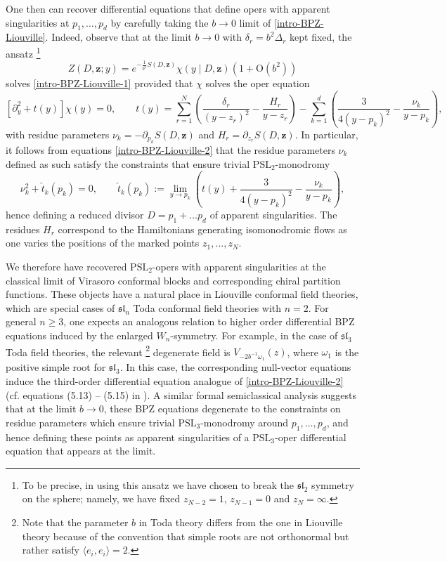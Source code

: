 \documentclass[twoside, 11pt]{article}
\numberwithin{equation}{section}
\theoremstyle{theorem}
\numberwithin{theorem}{section}
\theoremstyle{definition}
\begin{document}
One then can recover differential equations that define opers with apparent singularities at $p_1, \dots, p_d$ by carefully taking the $b \rightarrow 0$ limit of \eqref{intro-BPZ-Liouville}.
Indeed, observe that at the limit $b \rightarrow 0$ with $\delta_r = b^2 \Delta_r$ kept fixed, the ansatz 
\footnote{To be precise, in using this ansatz we have chosen to break the $\mathfrak{sl}_2$ symmetry on the sphere; namely, we have fixed $z_{N-2} = 1$, $z_{N-1} = 0$ and $z_N = \infty$.}
\[ Z(D, \mathbf{z}; y) =  e^{-\frac{1}{b^2}S(D, \mathbf{z})} \chi(y \mid D, \mathbf{z})  \left( 1 + \mathrm{O}(b^2) \right) \]
solves \eqref{intro-BPZ-Liouville-1} provided that $\chi$ solves the oper equation
\[ [\partial_y^2 + 
t(y)] \chi(y) = 0, \qquad t(y) = \sum_{r=1}^N \left( \frac{\delta_r}{(y-z_r)^2} - \frac{H_r}{y-z_r}\right) - 
\sum_{k=1}^d \left( \frac{3}{4(y-p_k)^2} - \frac{\nu_k}{y - p_k}\right), \]
with residue parameters $\nu_k = - \partial_{p_k} S(D, \mathbf{z})$ and $H_r = \partial_{z_r}S(D, \mathbf{z})$. In particular, it follows from equations \eqref{intro-BPZ-Liouville-2} that the residue parameters $\nu_k$ defined as such satisfy the constraints that ensure trivial $\mathrm{PSL}_2$-monodromy 
\[ \nu_k^2 + \check{t}_k(p_k) = 0, \qquad \check{t}_k(p_k) := \lim_{y \to p_k} \left( t(y) + \frac{3}{4(y - p_k)^2} - \frac{\nu_k}{y - p_k} \right), \] 
hence defining a reduced divisor $D = p_1 + \dots p_d$ of apparent singularities. The residues $H_r$ correspond to the Hamiltonians generating isomonodromic flows as one varies the positions of the marked points $z_1, \dots, z_N$.

We therefore have recovered $\mathrm{PSL}_2$-opers with apparent singularities at the classical limit of Virasoro conformal blocks and corresponding chiral partition functions. These objects have a natural place in Liouville conformal field theories, which are special cases of $\mathfrak{sl}_n$ Toda conformal field theories with $n = 2$. For general $n \geq 3$, one expects an analogous relation to higher order differential BPZ equations induced by the enlarged \(W_n\)-symmetry. For example, in the case of \(\mathfrak{sl}_3\) Toda field theories, the relevant 
\footnote{Note that the parameter $b$ in Toda theory differs from the one in Liouville theory because of the convention that simple roots are not orthonormal but rather satisfy $\langle e_i,e_i\rangle = 2$.}
degenerate field is \( V_{-2b^{-1}\omega_1}(z)\),
where $\omega_1$ is the positive simple root for $\mathfrak{sl}_3$.
In this case, the corresponding null-vector equations 
induce the third-order differential equation analogue of \eqref{intro-BPZ-Liouville-2} 
(cf. equations (5.13) -- (5.15) in \cite{CercleHuang2021}).
A similar formal semiclassical analysis suggests that at the limit $b \rightarrow 0$, these BPZ equations degenerate to the constraints on residue parameters which ensure trivial $\mathrm{PSL}_3$-monodromy around $p_1, \dots, p_d$, and hence defining these points as apparent singularities of a $\mathrm{PSL}_3$-oper differential equation that appears at the limit. 
\end{document}
